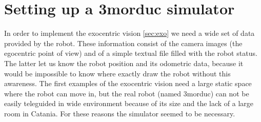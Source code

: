\section{Setting up a 3morduc simulator}
\label{sec:simulator}

\newline In order to implement the exocentric vision \ref{sec:exo} we need a wide set of data provided by the robot.
These information consist of the camera images (the egocentric point of view) and of a simple textual file filled with 
the robot status. The latter let us know the robot position and its odometric data, because it would be impossible to know 
where exactly draw the robot without this awareness.
\newline The first examples of the exocentric vision need a large static space where the robot can move in, but the real robot 
(named 3morduc) can not be easily teleguided in wide environment because of its size and the lack of a large room in Catania. For 
these reasons the simulator seemed to be necessary.








